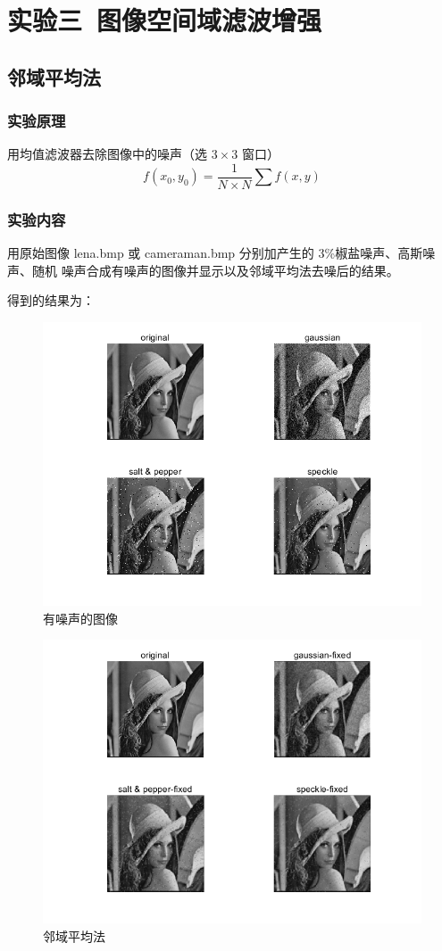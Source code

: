 \documentclass{ctexart}
\begin{document}
\section{\hei 实验三\ 图像空间域滤波增强}
\subsection{\hei 邻域平均法}
\subsubsection{\hei 实验原理}
用均值滤波器去除图像中的噪声（选 $3 \times 3$ 窗口）
$$
    f\left(x_{0}, y_{0}\right)=\frac{1}{N \times N} \sum f(x, y)
$$
\subsubsection{\hei 实验内容}
用原始图像 lena.bmp 或 cameraman.bmp 分别加产生的 3\%椒盐噪声、高斯噪声、随机
噪声合成有噪声的图像并显示以及邻域平均法去噪后的结果。
\par 得到的结果为：
\begin{figure}[H]
    \centering
    \includegraphics[scale=0.35]{zs.png}
    \caption{有噪声的图像}
\end{figure}
\begin{figure}[H]
    \centering
    \includegraphics[scale=0.35]{3_1.png}
    \caption{邻域平均法}
\end{figure}
\end{document}

